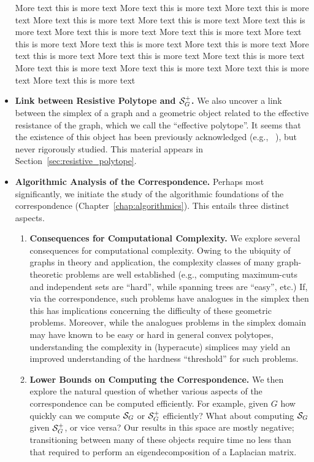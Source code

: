 \begin{itemize}
	More text this is more text More text this is more text More text this is more text More text this is more text More text this is more text More text this is more text More text this is more text More text this is more text More text this is more text More text this is more text More text this is more text More text this is more text More text this is more text More text this is more text More text this is more text More text this is more text More text this is more text More text this is more text 
	\item {\bf Link between Resistive Polytope and $\mathcal{S}_G^+$.} We also uncover a link between the simplex of a graph and a geometric  object related to the effective resistance of the graph, which we call the ``effective polytope''. It seems that the existence of this object has been previously acknowledged (e.g., ~\cite{shayanNotes}), but never rigorously studied. This material appears in Section~\ref{sec:resistive_polytope}. 
	\item {\bf Algorithmic Analysis of the Correspondence.} Perhaps most significantly, we initiate the study of the algorithmic foundations of the correspondence (Chapter~\ref{chap:algorithmics}). This entails three distinct aspects. 
	\begin{enumerate}
		\item {\bf Consequences for Computational Complexity.}	We explore several consequences for computational  complexity.  Owing to the ubiquity of graphs in theory and application, the complexity classes of many graph-theoretic problems are  well established (e.g., computing maximum-cuts and independent sets are ``hard'', while spanning trees are ``easy'', etc.) If, via the correspondence, such problems have analogues in the simplex then this has implications concerning the difficulty of these geometric problems. Moreover, while the analogues problems in the simplex domain may have known to be easy or hard  in general convex polytopes, understanding the complexity in (hyperacute) simplices may yield an improved understanding of the hardness ``threshold'' for such problems. 
		\item {\bf Lower Bounds on Computing the Correspondence.} We then explore the natural question of whether various aspects of the correspondence can be computed efficiently. For example, given $G$ how quickly can we compute $\mathcal{S}_G$ or $\mathcal{S}_G^+$ efficiently? What about computing $\mathcal{S}_G$ given $\mathcal{S}_G^+$, or vice  versa? Our results in this  space are mostly negative; transitioning between many of these objects require time no less than that required to perform an eigendecomposition of a Laplacian matrix. 

\end{enumerate}
\end{itemize}
